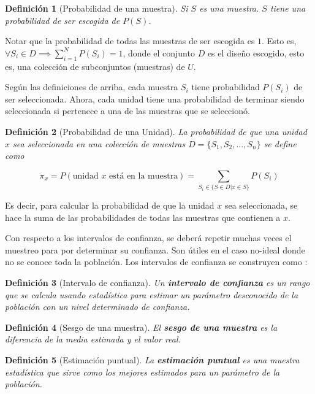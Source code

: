 \documentclass{report}
\newtheorem{definition}{Definición}
\begin{document}
\begin{definition}[Probabilidad de una muestra]
    Si $S$ es una muestra. $S$ tiene una probabilidad de ser escogida de $P(S)$.
\end{definition}

Notar que la probabilidad de todas las muestras de ser escogida es $1$. Esto es, $\forall S_i \in D \implies \sum_{i=1}^{N} P(S_i) = 1$, donde el conjunto $D$ es el diseño escogido, esto es, una colección de subconjuntos (muestras) de $U$.

\bigbreak

Según las definiciones de arriba, cada muestra $S_i$ tiene probabilidad $P(S_i)$ de ser seleccionada. Ahora, cada unidad tiene una probabilidad de terminar siendo seleccionada si pertenece a una de las muestras que se seleccionó.

\begin{definition}[Probabilidad de una Unidad]
    La probabilidad de que una unidad $x$ sea seleccionada en una colección de muestras $D = \{ S_1, S_2, ..., S_n \}$ se define como
    
    $$
    \pi_x = P(\text{unidad $x$ está en la muestra}) = \sum_{S_i \in \{ S \in D | x \in S \}} P(S_i)
    $$
\end{definition}

Es decir, para calcular la probabilidad de que la unidad $x$ sea seleccionada, se hace la suma de las probabilidades de todas las muestras que contienen a $x$.

Con respecto a los intervalos de confianza, se deberá repetir muchas veces el muestreo para por determinar su confianza. Son útiles en el caso no-ideal donde no se conoce toda la población. Los intervalos de confianza se construyen como \cite{the-pennsylvania-state-university-no-date}:

\begin{definition}[Intervalo de confianza]
    Un \textbf{intervalo de confianza} es un rango que se calcula usando estadística para estimar un parámetro desconocido de la población con un nivel determinado de confianza. 
\end{definition}

\begin{definition}[Sesgo de una muestra]
    El \textbf{sesgo de una muestra} es la diferencia de la media estimada y el valor real.
\end{definition}

\begin{definition}[Estimación puntual]
    La \textbf{estimación puntual} es una muestra estadística que sirve como los mejores estimados para un parámetro de la población.
\end{definition}
\end{document}
